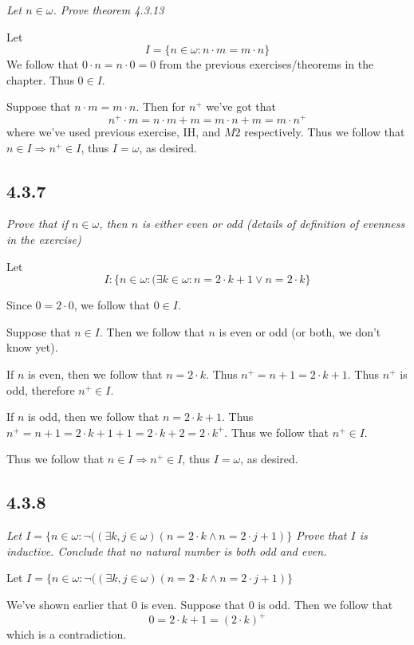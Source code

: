 \documentclass[11pt,oneside,titlepage]{book}
\DeclareMathOperator \ra {\Rightarrow}
\begin{document}
\textit{Let $n \in \omega$. Prove theorem 4.3.13}

Let
$$I = \{n \in \omega: n \cdot m = m \cdot n\}$$
We follow that $0 \cdot n = n \cdot 0 = 0$ from the previous exercises/theorems in the
chapter. Thus $0 \in I$.

Suppose that $n \cdot m = m \cdot n$. Then for $n^+$ we've got that
$$n^+ \cdot m = n \cdot m + m = m \cdot n + m = m \cdot n^+$$
where we've used previous exercise, IH, and $M2$ respectively. Thus we follow that
$n \in I \ra n^+ \in I$, thus $I = \omega$, as desired.

\subsection*{4.3.7}

\textit{Prove that if $n \in \omega$, then $n$ is either even or odd (details of definition
  of evenness in the exercise)}

Let
$$I: \{n \in \omega: (\exists k \in \omega: n = 2 \cdot k + 1 \lor n = 2 \cdot k\}$$

Since $0 = 2 \cdot 0$, we follow that $0 \in I$.

Suppose that $n \in I$. Then we follow that $n$ is even or odd (or both, we don't know yet).

If $n$ is even, then we follow that $n = 2 \cdot k$. Thus $n^+ = n + 1 = 2 \cdot k + 1$. Thus
$n^+$ is odd, therefore $n^+ \in I$.

If $n$ is odd, then we follow that $n = 2 \cdot k + 1$. Thus $n^+ = n + 1 = 2 \cdot k + 1 + 1 =
2 \cdot k + 2 = 2 \cdot k^+$. Thus we follow that $n^+ \in I$.

Thus we follow that $n \in I \ra n^+ \in I$, thus $I = \omega$, as desired.

\subsection*{4.3.8}

\textit{Let $I = \{n \in \omega: \neg((\exists k, j \in \omega)(n = 2 \cdot k \land
  n = 2 \cdot j + 1)\}$
  Prove that $I$ is inductive. Conclude that no natural number is both odd and even.}

Let
$I = \{n \in \omega: \neg((\exists k, j \in \omega)(n = 2 \cdot k \land n = 2 \cdot j + 1)\}$

We've shown earlier that $0$ is even. Suppose that $0$ is odd. Then we follow that
$$0 = 2 \cdot k + 1 = (2 \cdot k)^+$$
which is a contradiction.
\end{document}
